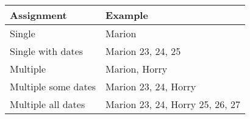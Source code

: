 \begin{tabular}{|l|l|}
\hline
\textbf{Assignment} & \textbf{Example}                \\ \hline
Single              & Marion                          \\ \hline
Single with dates   & Marion 23, 24, 25               \\ \hline
Multiple            & Marion, Horry                   \\ \hline
Multiple some dates & Marion 23, 24, Horry            \\ \hline
Multiple all dates  & Marion 23, 24, Horry 25, 26, 27 \\ \hline
\end{tabular}
